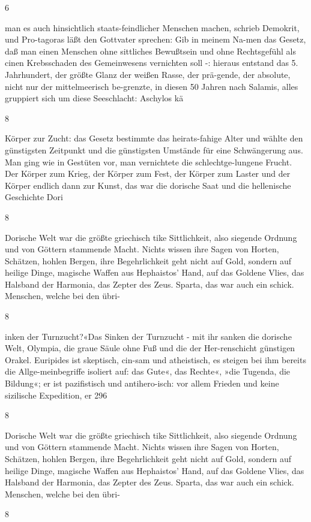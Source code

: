\documentclass[
  letterpaper,
  DIV=11,
  numbers=noendperiod]{scrartcl}
\begin{document}
6

man es auch hinsichtlich staats-feindlicher Menschen machen, schrieb
Demokrit, und Pro-tagoras läßt den Gottvater sprechen: Gib in meinem
Na-men das Gesetz, daß man einen Menschen ohne sittliches Bewußtsein und
ohne Rechtsgefühl als cinen Krebsschaden des Gemeinwesens vernichten
soll -: hieraus entstand das 5. Jahrhundert, der größte Glanz der weißen
Rasse, der prä-gende, der absolute, nicht nur der mittelmeerisch
be-grenzte, in diesen 50 Jahren nach Salamis, alles gruppiert sich um
diese Seeschlacht: Aschylos kä

8

Körper zur Zucht: das Gesetz bestimmte das heirats-fahige Alter und
wählte den günstigsten Zeitpunkt und die günstigsten Umstände für eine
Schwängerung aus. Man ging wie in Gestüten vor, man vernichtete die
schlechtge-lungene Frucht. Der Körper zum Krieg, der Körper zum Fest,
der Körper zum Laster und der Körper endlich dann zur Kunst, das war die
dorische Saat und die hellenische Geschichte Dori

8

Dorische Welt war die größte griechisch tike Sittlichkeit, also siegende
Ordnung und von Göttern stammende Macht. Nichts wissen ihre Sagen von
Horten, Schätzen, hohlen Bergen, ihre Begehrlichkeit geht nicht auf
Gold, sondern auf heilige Dinge, magische Waffen aus Hephaistos' Hand,
auf das Goldene Vlies, das Halsband der Harmonia, das Zepter des Zeus.
Sparta, das war auch ein schick. Menschen, welche bei den übri-

8

inken der Turnzucht?«Das Sinken der Turnzucht - mit ihr sanken die
dorische Welt, Olympia, die graue Säule ohne Fuß und die der
Her-renschicht günstigen Orakel. Euripides ist skeptisch, cin-sam und
atheistisch, es steigen bei ihm bereits die Allge-meinbegriffe isoliert
auf: das Gute«, das Rechte«, »die Tugenda, die Bildung«; er ist
pazifistisch und antihero-isch: vor allem Frieden und keine sizilische
Expedition, er 296

8

Dorische Welt war die größte griechisch tike Sittlichkeit, also siegende
Ordnung und von Göttern stammende Macht. Nichts wissen ihre Sagen von
Horten, Schätzen, hohlen Bergen, ihre Begehrlichkeit geht nicht auf
Gold, sondern auf heilige Dinge, magische Waffen aus Hephaistos' Hand,
auf das Goldene Vlies, das Halsband der Harmonia, das Zepter des Zeus.
Sparta, das war auch ein schick. Menschen, welche bei den übri-

8
\end{document}
